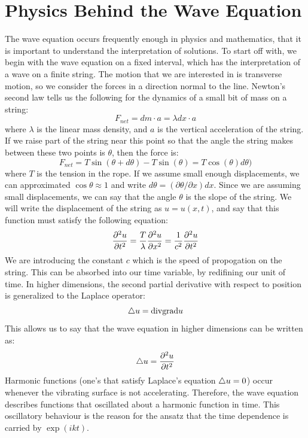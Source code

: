 \documentclass{paper}
\begin{document}
\section{Physics Behind the Wave Equation}
The wave equation occurs frequently enough in physics and mathematics, that it is important to understand the interpretation of solutions. To start off with, we begin with the wave equation on a fixed interval, which has the interpretation of a wave on a finite string. The motion that we are interested in is transverse motion, so we consider the forces in a direction normal to the line. Newton's second law tells us the following for the dynamics of a small bit of mass on a string:
\begin{equation}
    F_{net}=dm\cdot a=\lambda dx \cdot a
\end{equation}
where $\lambda$ is the linear mass density, and $a$ is the vertical acceleration of the string. If we raise part of the string near this point so that the angle the string makes between these two points is $\theta$, then the force is:
\begin{equation}
    F_{net}=T \sin(\theta + d\theta)-T \sin(\theta)=T\cos(\theta)d\theta)
\end{equation}
where $T$ is the tension in the rope. If we assume small enough displacements, we can approximated $\cos\theta\approx 1$ and write $d\theta= (\partial\theta/\partial x) dx$. Since we are assuming small displacements, we can say that the angle $\theta$ is the slope of the string. We will write the displacement of the string as $u=u(x,t)$, and say that this function must satisfy the following equation:
\begin{equation}\frac{\partial ^2 u}{\partial t^2}= \frac{T}{\lambda}\frac{\partial ^2 u}{\partial x^2}=\frac{1}{c^2} \frac{\partial ^2 u}{\partial t^2}\end{equation}
We are introducing the constant $c$ which is the speed of propogation on the string. This can be absorbed into our time variable, by redifining our unit of time. In higher dimensions, the second partial derivative with respect to position is generalized to the Laplace operator:
\begin{equation}\bigtriangleup u=\mathrm{div}\mathrm{grad} u\end{equation}
This allows us to say that the wave equation in higher dimensions can be written as:
\begin{equation}
    \bigtriangleup u=\frac{\partial ^2 u}{\partial t^2}
\end{equation}
Harmonic functions (one's that satisfy Laplace's equation $\bigtriangleup u=0$) occur whenever the vibrating surface is not accelerating. Therefore, the wave equation describes functions that oscillated about a harmonic function in time. This oscillatory behaviour is the reason for the ansatz that the time dependence is carried by $\exp(i k t)$.
\end{document}
